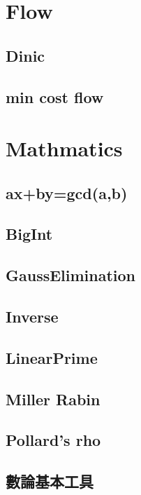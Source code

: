 \section{Flow}

\subsection{Dinic}

\subsection{min cost flow}


\section{Mathmatics}

\subsection{ax+by=gcd(a,b)}

\subsection{BigInt}

\subsection{GaussElimination}

\subsection{Inverse}

\subsection{LinearPrime}

\subsection{Miller Rabin}

\subsection{Pollard's rho}

\subsection{數論基本工具}

